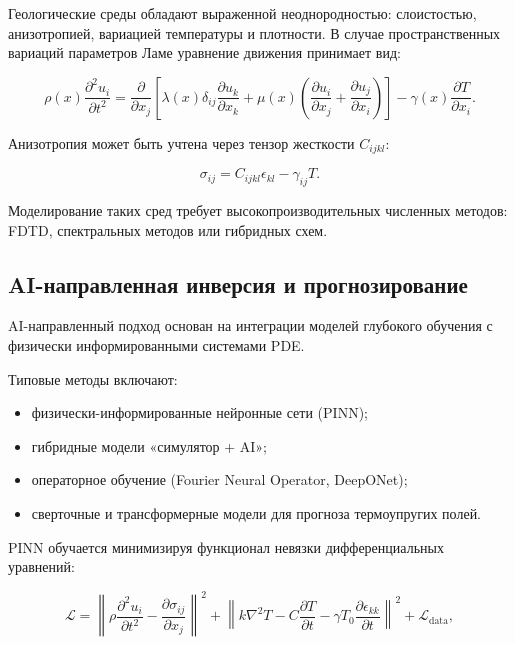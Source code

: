 Геологические среды обладают выраженной неоднородностью: слоистостью, анизотропией, вариацией температуры и плотности. В случае пространственных вариаций параметров Ламе уравнение движения  принимает вид:

\begin{equation}
\rho(x) \frac{\partial^2 u_i}{\partial t^2} =
\frac{\partial}{\partial x_j}
\left[
\lambda(x) \delta_{ij} \frac{\partial u_k}{\partial x_k}
+ \mu(x) \left(
\frac{\partial u_i}{\partial x_j} + \frac{\partial u_j}{\partial x_i}
\right)
\right]
- \gamma(x) \frac{\partial T}{\partial x_i}.
\end{equation}

Анизотропия может быть учтена через тензор жесткости $C_{ijkl}$:

\begin{equation}
\sigma_{ij} = C_{ijkl} \epsilon_{kl} - \gamma_{ij} T.
\end{equation}

Моделирование таких сред требует высокопроизводительных численных методов: FDTD, спектральных методов или гибридных схем.

\subsection{AI-направленная инверсия и прогнозирование}

AI-направленный подход основан на интеграции моделей глубокого обучения с физически информированными системами PDE.  

Типовые методы включают:

\begin{itemize}
    \item физически-информированные нейронные сети (PINN);
    \item гибридные модели «симулятор + AI»;
    \item операторное обучение (Fourier Neural Operator, DeepONet);
    \item сверточные и трансформерные модели для прогноза термоупругих полей.
\end{itemize}

PINN обучается минимизируя функционал невязки дифференциальных уравнений:

\begin{equation}
\mathcal{L} = 
\left\|
\rho \frac{\partial^2 u_i}{\partial t^2} -
\frac{\partial \sigma_{ij}}{\partial x_j}
\right\|^2
+
\left\|
k \nabla^2 T - C \frac{\partial T}{\partial t}
- \gamma T_0 \frac{\partial \epsilon_{kk}}{\partial t}
\right\|^2
+
\mathcal{L}_\text{data},
\end{equation}

